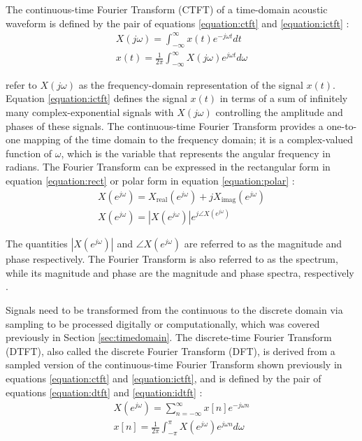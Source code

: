 \documentclass[report.tex]{subfiles}
\begin{document}
The continuous-time Fourier Transform (CTFT) of a time-domain acoustic waveform is defined by the pair of equations \eqref{equation:ctft} and \eqref{equation:ictft} \parencite[308]{dspfirst}:
\begin{align}
	X(j\omega) = \int_{-\infty}^{\infty}{x(t)e^{-j\omega t}\mathit{dt}} \tag{1}\label{equation:ctft} \\
	x(t) = \frac{1}{2\pi}\int_{-\infty}^{\infty}{X(j\omega)e^{j\omega t}\mathit{d\omega}} \tag{2}\label{equation:ictft}
\end{align}

\textcite{dspfirst} refer to $X(j\omega)$ as the frequency-domain representation of the signal $x(t)$. Equation \eqref{equation:ictft} defines the signal $x(t)$ in terms of a sum of infinitely many complex-exponential signals with $X(j\omega)$ controlling the amplitude and phases of these signals. The continuous-time Fourier Transform provides a one-to-one mapping of the time domain to the frequency domain; it is a complex-valued function of $\omega$, which is the variable that represents the angular frequency in radians. The Fourier Transform can be expressed in the rectangular form in equation \eqref{equation:rect} or polar form in equation \eqref{equation:polar} \parencite[49]{discretebook}:
\begin{align}
	X(e^{j\omega}) = X_{\text{real}}(e^{j\omega}) + j X_{\text{imag}}(e^{j\omega}) \tag{3}\label{equation:rect} \\
	X(e^{j\omega}) = |X(e^{j\omega})|e^{j\angle X(e^{j\omega})} \tag{4}\label{equation:polar}
\end{align}

The quantities $|X(e^{j\omega})|$ and $\angle X(e^{j\omega})$ are referred to as the magnitude and phase respectively. The Fourier Transform is also referred to as the spectrum, while its magnitude and phase are the magnitude and phase spectra, respectively \parencite{discretebook}.

Signals need to be transformed from the continuous to the discrete domain via sampling to be processed digitally or computationally, which was covered previously in Section \ref{sec:timedomain}. The discrete-time Fourier Transform (DTFT), also called the discrete Fourier Transform (DFT), is derived from a sampled version of the continuous-time Fourier Transform shown previously in equations \eqref{equation:ctft} and \eqref{equation:ictft}, and is defined by the pair of equations \eqref{equation:dtft} and \eqref{equation:idtft} \parencite[289]{melbook}:
\begin{align}
	X(e^{j\omega}) = \sum_{n = -\infty}^{\infty}{x[n]e^{-j\omega n}} \tag{5}\label{equation:dtft} \\
	x[n] = \frac{1}{2\pi}\int_{-\pi}^{\pi}{X(e^{j\omega})e^{j\omega n}\mathit{d\omega}} \tag{6}\label{equation:idtft}
\end{align}
\end{document}
